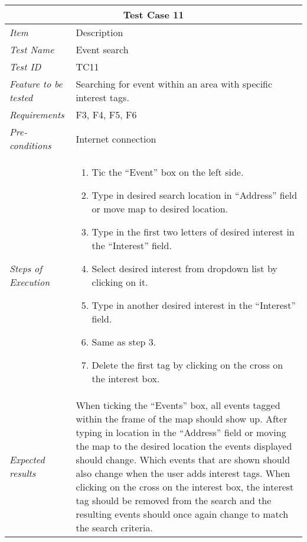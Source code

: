 %
\begin{minipage}{\linewidth}
\setlength{\tabcolsep}{15pt}
\centering
{}
\begin{tabular}{ |l|p{70mm}| }
	\hline
	\multicolumn{2}{|c|}{\cellcolor{gray!25} \textbf{Test Case 11}} \\
	\hline
	\it{\cellcolor{gray!25}Item} & {\cellcolor{gray!25} Description } \\
	\hline
	\it{\cellcolor{gray!25}Test Name } & Event search \\ \hline
	\it{\cellcolor{gray!25}Test ID} & TC11 \\ \hline
	\it{\cellcolor{gray!25}Feature to be tested} & Searching for event within an area with specific interest tags. \\ \hline
	\it{\cellcolor{gray!25}Requirements} & F3, F4, F5, F6  \\ \hline
	\it{\cellcolor{gray!25}Pre-conditions} & Internet connection \\ \hline
	\it{\cellcolor{gray!25}Steps of Execution} & \begin{enumerate}
	                                       \item Tic the “Event” box on the left side.
	                                       \item Type in desired search location in “Address” field or move map to desired location.
	                                       \item Type in the first two letters of desired interest in the “Interest” field.
	                                       \item Select desired interest from dropdown list by clicking on it.
	                                       \item Type in another desired interest in the “Interest” field.
	                                       \item Same as step 3.
	                                       \item Delete the first tag by clicking on the cross on the interest box.
	                                     \end{enumerate} \\ \hline
	\it{\cellcolor{gray!25}Expected results} & When ticking the “Events” box, all events tagged within the frame of the map should show up. After typing in location in the “Address” field or moving the map to the desired location the events displayed should change. Which events that are shown should also change when the user adds interest tags. When clicking on the cross on the interest box, the interest tag should be removed from the search and the resulting events should once again change to match the search criteria.  \\
	\hline
\end{tabular}
\medskip
\end{minipage}
